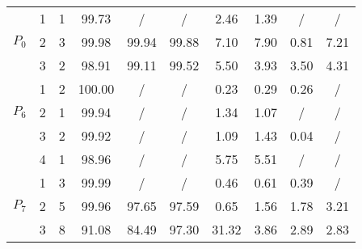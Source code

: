 \documentclass[11pt]{article}
\begin{document}
\begin{table}
\begin{tabular}{ccc|c|c|c|c|c|c|c|}
\multicolumn{1}{|c|}{\multirow{3}{*}{$P_0$}} & \multicolumn{1}{c|}{1} 
 & 1 & 99.73 & / & / & 2.46 & 1.39 & / & / \\ \cline{2-10} 
\multicolumn{1}{|c|}{} & \multicolumn{1}{c|}{2} 
 & 3 & 99.98 & 99.94 & 99.88 & 7.10 & 7.90 & 0.81 & 7.21 \\ \cline{2-10} 
\multicolumn{1}{|c|}{} & \multicolumn{1}{c|}{3} 
 & 2 & 98.91 & 99.11 & 99.52 & 5.50 & 3.93 & 3.50 & 4.31 \\ \hline \hline

\multicolumn{1}{|c|}{\multirow{3}{*}{$P_6$}} & \multicolumn{1}{c|}{1} 
 & 2 & 100.00 & / & / & 0.23 & 0.29 & 0.26 & / \\ \cline{2-10} 
\multicolumn{1}{|c|}{} & \multicolumn{1}{c|}{2} 
 & 1 & 99.94 & / & / & 1.34 & 1.07 & / & / \\ \cline{2-10} 
\multicolumn{1}{|c|}{} & \multicolumn{1}{c|}{3} 
 & 2 & 99.92 & / & / & 1.09 & 1.43 & 0.04 & / \\ \cline{2-10} 
\multicolumn{1}{|c|}{} & \multicolumn{1}{c|}{4} 
 & 1 & 98.96 & / & / & 5.75 & 5.51 & / & / \\ \hline \hline

\multicolumn{1}{|c|}{\multirow{3}{*}{$P_7$}} & \multicolumn{1}{c|}{1} 
 & 3 & 99.99 & / & / & 0.46 & 0.61 & 0.39 & / \\ \cline{2-10} 
\multicolumn{1}{|c|}{} & \multicolumn{1}{c|}{2} 
 & 5 & 99.96 & 97.65 & 97.59 & 0.65 & 1.56 & 1.78 & 3.21 \\ \cline{2-10} 
\multicolumn{1}{|c|}{} & \multicolumn{1}{c|}{3} 
 & 8 & 91.08 & 84.49 & 97.30 & 31.32 & 3.86 & 2.89 & 2.83 \\ \hline

\end{tabular}
\end{table}
\end{document}
